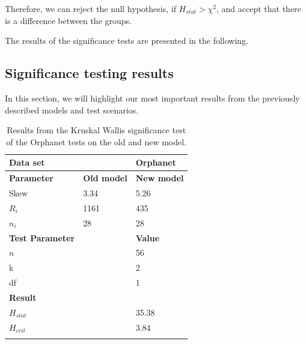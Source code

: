 \documentclass[10pt,letterpaper,final]{article}
\begin{document}
Therefore, we can reject the null hypothesis, if $H_{stat} > \chi^2$,
and accept that there is a difference between the groups.

The results of the significance tests are presented in the following.


\subsection{Significance testing results}
In this section, we will highlight our most important results from the
previously described models and test scenarios.

\begin{table}[here]
\begin{center}
\begin{tabular}{lll}
    \textbf{Data set} & & \textbf{Orphanet} \\ \hline\hline
    \textbf{Parameter} & \textbf{Old model} & \textbf{New model} \\ \hline
    Skew & 3.34 & 5.26 \\
    $R_{i}$ & 1161 & 435 \\
    $n_{i}$ & 28 & 28 \\ \hline\hline
    \textbf{Test Parameter} & & \textbf{Value} \\ \hline
    $n$ && 56  \\
    k && 2  \\
    df && 1  \\ \hline \hline
    \textbf{Result} & & \\\hline
    $H_{stat}$ & & 35.38 \\
    $H_{crit}$ & & 3.84 \\
    \label{tab:orpha_old_new}
\end{tabular}
    \caption{Results from the Kruskal Wallis significance test of the
    Orphanet tests on the old and new model.}
\end{center}
\end{table}

\end{document}
